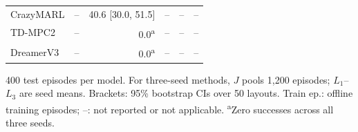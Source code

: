 \begin{table}[t]
\begin{tabular*}{\columnwidth}{@{\extracolsep{\fill}}lrrrrr@{}}
CrazyMARL & -- & 40.6 [30.0, 51.5] & -- & -- & -- \\
TD-MPC2 & -- & 0.0\textsuperscript{a} & -- & -- & -- \\
DreamerV3 & -- & 0.0\textsuperscript{a} & -- & -- & -- \\
\hline
\end{tabular*}
\par\vspace{2pt}
\begin{minipage}{\columnwidth}
\scriptsize\raggedright
400 test episodes per model. For three-seed methods, $J$ pools 1,200 episodes; $L_1$--$L_3$ are seed means. Brackets: 95\% bootstrap CIs over 50 layouts. Train ep.: offline training episodes; --: not reported or not applicable. \textsuperscript{a}Zero successes across all three seeds.
\end{minipage}
\end{table}
